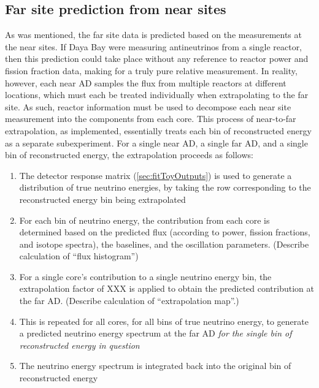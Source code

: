 \documentclass[../thesis.tex]{subfiles}
\begin{document}
\begin{comment}
Compared to the toy Monte Carlo, the LBNL shape fitter is a relatively simple thing.

Its job is just to find the oscillation parameters that best fit the data, i.e. that give the lowest chi2.

It also produces a map of chi2 in parameter space for derivation of contours.
\end{comment}

\subsection{Far site prediction from near sites}
\label{sec:fitNearToFarPred}

As was mentioned, the far site data is predicted based on the measurements at the near sites. If Daya Bay were measuring antineutrinos from a single reactor, then this prediction could take place without any reference to reactor power and fission fraction data, making for a truly pure relative measurement. In reality, however, each near AD samples the flux from multiple reactors at different locations, which must each be treated individually when extrapolating to the far site. As such, reactor information must be used to decompose each near site measurement into the components from each core. This process of near-to-far extrapolation, as implemented, essentially treats each bin of reconstructed energy as a separate subexperiment. For a single near AD, a single far AD, and a single bin of reconstructed energy, the extrapolation proceeds as follows:

\begin{enumerate}
\item The detector response matrix (\autoref{sec:fitToyOutputs}) is used to generate a distribution of true neutrino energies, by taking the row corresponding to the reconstructed energy bin being extrapolated
\item For each bin of neutrino energy, the contribution from each core is determined based on the predicted flux (according to power, fission fractions, and isotope spectra), the baselines, and the oscillation parameters. (Describe calculation of ``flux histogram'')
\item For a single core's contribution to a single neutrino energy bin, the extrapolation factor of XXX is applied to obtain the predicted contribution at the far AD. (Describe calculation of ``extrapolation map''.)
\item This is repeated for all cores, for all bins of true neutrino energy, to generate a predicted neutrino energy spectrum at the far AD \emph{for the single bin of reconstructed energy in question}
\item The neutrino energy spectrum is integrated back into the original bin of reconstructed energy
\end{enumerate}
\end{document}
